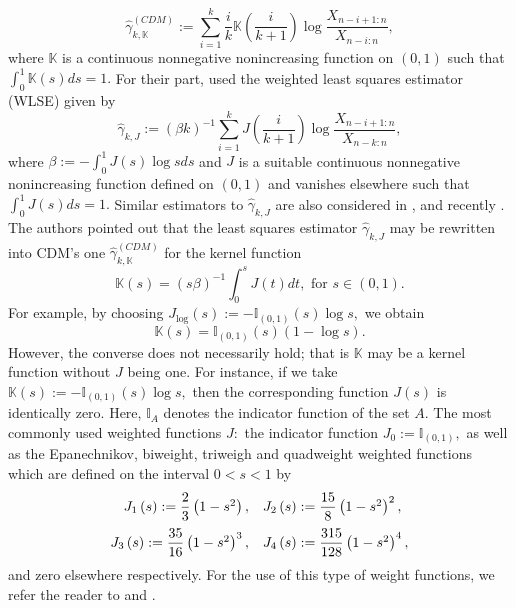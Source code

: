 \documentclass[12pt,reqno,openbib,runningheads,a4paper,portrait]{amsart}%
\begin{document}
\begin{equation}
\widehat{\gamma}_{k,\mathbb{K}}^{\left(  CDM\right)  }:=%
{\displaystyle\sum_{i=1}^{k}}
\dfrac{i}{k}\mathbb{K}\left(  \dfrac{i}{k+1}\right)  \log\dfrac{X_{n-i+1:n}%
}{X_{n-i:n}}, \label{cdm}%
\end{equation}
where $\mathbb{K}$ is a continuous nonnegative nonincreasing function on
$\left(  0,1\right)  $ such that $\int_{0}^{1}\mathbb{K}\left(  s\right)
ds=1.$ For their part, \cite{HLM2006} used the weighted least squares
estimator (WLSE) given by%
\begin{equation}
\widehat{\gamma}_{k,J}:=\left(  \beta k\right)  ^{-1}%
{\displaystyle\sum\limits_{i=1}^{k}}
J\left(  \dfrac{i}{k+1}\right)  \log\dfrac{X_{n-i+1:n}}{X_{n-k:n}},
\label{HLM}%
\end{equation}
where $\beta:=-\int_{0}^{1}J\left(  s\right)  \log sds$ and $J$ is a suitable
continuous nonnegative nonincreasing function defined on $\left(  0,1\right)
$ and vanishes elsewhere such that $\int_{0}^{1}J\left(  s\right)  ds=1.$
Similar estimators to $\widehat{\gamma}_{k,J}$ are also considered in
\cite{BVT96}, \cite{V99} and recently \cite{CMS21}. The authors pointed out
that the least squares estimator $\widehat{\gamma}_{k,J}$ may be rewritten
into CDM's one $\widehat{\gamma}_{k,\mathbb{K}}^{\left(  CDM\right)  }$ for
the kernel function%
\begin{equation}
\mathbb{K}\left(  s\right)  =\left(  s\beta\right)  ^{-1}\int_{0}^{s}J\left(
t\right)  dt,\text{ for }s\in\left(  0,1\right)  . \label{f}%
\end{equation}
For example, by choosing $J_{\log}\left(  s\right)  :=-\mathbb{I}_{\left(
0,1\right)  }\left(  s\right)  \log s,$ we obtain
\[
\mathbb{K}\left(  s\right)  =\mathbb{I}_{\left(  0,1\right)  }\left(
s\right)  \left(  1-\log s\right)  .
\]
However, the converse does not necessarily hold; that is $\mathbb{K}$ may be a
kernel function without $J$ being one. For instance, if we take $\mathbb{K}%
\left(  s\right)  :=-\mathbb{I}_{\left(  0,1\right)  }\left(  s\right)  \log
s,$ then the corresponding function $J\left(  s\right)  $ is identically zero.
Here, $\mathbb{I}_{A}$ denotes the indicator function of the set $A.$ The most
commonly used weighted functions $J:$ the indicator function $J_{0}%
:=\mathbb{I}_{\left(  0,1\right)  },$ as well as the Epanechnikov, biweight,
triweigh and quadweight weighted functions which are defined on the interval
$0<s<1$ by%
\begin{equation}%
\begin{array}
[c]{rl}%
J_{1}\left(  s\right)  :=\dfrac{2}{3}\left(  1-s^{2}\right)  , & J_{2}\left(
s\right)  :=\dfrac{15}{8}\left(  1-s^{2}\right)  ^{2},\medskip\\
J_{3}\left(  s\right)  :=\dfrac{35}{16}\left(  1-s^{2}\right)  ^{3}, &
J_{4}\left(  s\right)  :=\dfrac{315}{128}\left(  1-s^{2}\right)  ^{4},
\end{array}
\label{J}%
\end{equation}
and zero elsewhere respectively. For the use of this type of weight functions,
we refer the reader to \cite{GLW2003} and \cite{HLM2006}.\medskip
\end{document}
